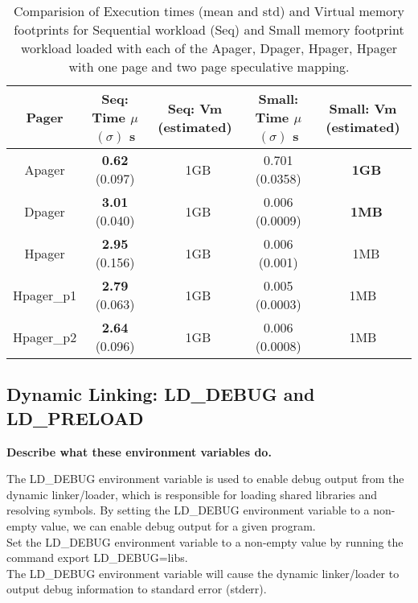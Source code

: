 \documentclass{article}
\begin{document}
    \begin{table}
    \centering
    \begin{tabular}{|c|c|c|c|c|}
        \hline
        Pager & Seq: Time $\mu$ $(\sigma)$ s& Seq: Vm (estimated)& Small: Time $\mu$ $(\sigma)$ s& Small: Vm (estimated)\\
        \hline
        Apager & \textbf{0.62} (0.097) & ~1GB & 0.701 (0.0358) & \textbf{~1GB}\\
        \hline
        Dpager & \textbf{3.01} (0.040) & ~1GB & 0.006 (0.0009) & \textbf{~1MB}\\ 
        \hline
        Hpager & \textbf{2.95} (0.156) & ~1GB & 0.006 (0.001) & ~1MB\\
        \hline
        Hpager\_p1 & \textbf{2.79} (0.063) & ~1GB & 0.005 (0.0003) & 1MB\\ 
        \hline
        Hpager\_p2 & \textbf{2.64} (0.096) & ~1GB & 0.006 (0.0008) & 1MB\\
        \hline
    \end{tabular}
    \caption{\label{tab:widgets}Comparision of Execution times (mean and std) and Virtual memory footprints 
    for Sequential workload (Seq) and Small memory footprint workload loaded with each of the Apager, Dpager,
    Hpager, Hpager with one page and two page speculative mapping.}
    \vspace{0.5cm}
    \end{table}


\subsection{Dynamic Linking: LD\_DEBUG and LD\_PRELOAD}

\textbf{Describe what these environment variables do.}

The LD\_DEBUG environment variable is used to enable debug output from the dynamic linker/loader, 
which is responsible for loading shared libraries and resolving symbols. By setting the LD\_DEBUG 
environment variable to a non-empty value, we can enable debug output for a given program.\\

Set the LD\_DEBUG environment variable to a non-empty value by running the command export LD\_DEBUG=libs.\\

The LD\_DEBUG environment variable will cause the dynamic linker/loader to output debug information to 
standard error (stderr). \\
\end{document}
